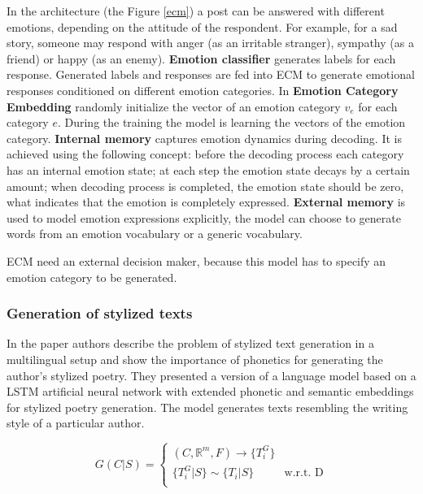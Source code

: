 In the architecture (the Figure \ref{ecm}) a post can be answered with different emotions, depending on the attitude of the respondent. For example, for a sad story, someone may respond with anger  (as an irritable stranger), sympathy (as a friend) or happy (as an enemy). \textbf{Emotion classifier} generates labels for each response. Generated labels and responses are fed into ECM to generate emotional responses conditioned on different emotion categories. In \textbf{Emotion Category Embedding} randomly initialize the vector of an emotion category $v_e$ for each category $e$. During the training the model is learning the vectors of the emotion category. \textbf{Internal memory} captures emotion dynamics during decoding. It is achieved using the following concept: before the decoding process each category has an internal emotion state; at each step the emotion state decays by a certain amount; when decoding process is completed, the emotion state should be zero, what indicates that the emotion is completely expressed. \textbf{External memory} is used to model emotion expressions explicitly, the model can choose to generate words from  an emotion vocabulary or a generic vocabulary.

ECM need an external decision maker, because this model has to specify an emotion category to be generated.

\subsubsection{Generation of stylized texts}

In the paper \cite{tikhonov2018guess} authors describe the problem of stylized text generation in a multilingual setup and show the importance of phonetics for generating the author's stylized poetry. They presented a version of a language model based on a LSTM artificial neural network with extended phonetic and semantic embeddings for stylized poetry generation. The model generates texts resembling the writing style of a particular author.

\begin{equation} \label{eq:poetry_nlg}
G(C|S) = \begin{cases} 
          (C, \mathbb{R}^m, F) \rightarrow \{T_i^G\} \\
          \{T_i^G|S\}  \mathtt{\sim}  \{T_i|S\} & \mbox{w.r.t. D}\\
         \end{cases}
\end{equation}

